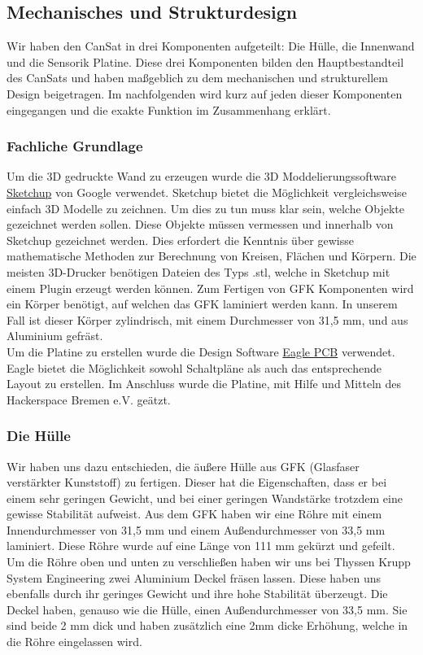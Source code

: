 \subsection{Mechanisches und Strukturdesign}

Wir haben den CanSat in drei Komponenten aufgeteilt: Die Hülle, die Innenwand und die Sensorik Platine. Diese drei Komponenten bilden den Hauptbestandteil des CanSats und haben maßgeblich zu dem mechanischen und strukturellem Design beigetragen. Im nachfolgenden wird kurz auf jeden dieser Komponenten eingegangen und die exakte Funktion im Zusammenhang erklärt.

\subsubsection{Fachliche Grundlage}
Um die 3D gedruckte Wand zu erzeugen wurde die 3D Moddelierungssoftware \href{http://www.sketchup.com/de} {Sketchup} von Google verwendet. Sketchup bietet die Möglichkeit vergleichsweise einfach 3D Modelle zu zeichnen. Um dies zu tun muss klar sein, welche Objekte gezeichnet werden sollen. Diese Objekte müssen vermessen und innerhalb von Sketchup gezeichnet werden. Dies erfordert die Kenntnis über gewisse mathematische Methoden zur Berechnung von Kreisen, Flächen und Körpern. Die meisten 3D-Drucker benötigen Dateien des Typs .stl, welche in Sketchup mit einem Plugin erzeugt werden können.
Zum Fertigen von GFK Komponenten wird ein Körper benötigt, auf welchen das GFK laminiert werden kann. In unserem Fall ist dieser Körper zylindrisch, mit einem Durchmesser von 31,5 mm, und aus Aluminium gefräst. \\
Um die Platine zu erstellen wurde die Design Software \href{http://www.cadsoft.de/eagle-pcb-design-software/} {Eagle PCB} verwendet. Eagle bietet die Möglichkeit sowohl Schaltpläne als auch das entsprechende Layout zu erstellen. Im Anschluss wurde die Platine, mit Hilfe und Mitteln des Hackerspace Bremen e.V. geätzt.

\subsubsection{Die Hülle}
Wir haben uns dazu entschieden, die äußere Hülle aus GFK (Glasfaser verstärkter Kunststoff) zu fertigen. Dieser hat die Eigenschaften, dass er bei einem sehr geringen Gewicht, und bei einer geringen Wandstärke trotzdem eine gewisse Stabilität aufweist. Aus dem GFK haben wir eine Röhre mit einem Innendurchmesser von 31,5 mm und einem Außendurchmesser von 33,5 mm laminiert. Diese Röhre wurde auf eine Länge von 111 mm gekürzt und gefeilt. Um die Röhre oben und unten zu verschließen haben wir uns bei Thyssen Krupp System Engineering zwei Aluminium Deckel fräsen lassen. Diese haben uns ebenfalls durch ihr geringes Gewicht und ihre hohe Stabilität überzeugt. Die Deckel haben, genauso wie die Hülle, einen Außendurchmesser von 33,5 mm. Sie sind beide 2 mm dick und haben zusätzlich eine 2mm dicke Erhöhung, welche in die Röhre eingelassen wird.

